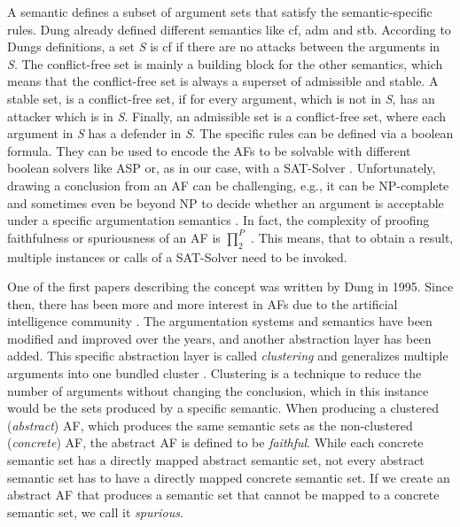A semantic defines a subset of argument sets that satisfy the semantic-specific rules. Dung already defined different semantics \cite{Dung1995-DUNOTA-2} like \ac{cf}, \ac{adm} and \ac{stb}. According to Dungs definitions, a set \textit{S} is \ac{cf} if there are no attacks between the arguments in \textit{S}. The conflict-free set is mainly a building block for the other semantics, which means that the conflict-free set is always a superset of admissible and stable. 
A stable set, is a conflict-free set, if for every argument, which is not in \textit{S}, has an attacker which is in \textit{S}. 
Finally, an admissible set is a conflict-free set, where each argument in \textit{S} has a defender in \textit{S}. 
The specific rules can be defined via a boolean formula. They can be used to encode the \acp{AF} to be solvable with different boolean solvers like \ac{ASP} \cite{DBLP:journals/corr/abs-1301-1388} or, as in our case, with a \ac{SAT-Solver} \cite{DBLP:journals/amai/AmgoudD13}. Unfortunately, drawing a conclusion from an AF can be challenging, e.g., it can be NP-complete and sometimes even be beyond NP to decide whether an argument is acceptable under a specific argumentation semantics \cite{DBLP:journals/ai/DvorakGRW23}. In fact, the complexity of proofing faithfulness or spuriousness of an \ac{AF} is $\prod_2^P$ \cite{DBLP:conf/kr/SaribaturW21}. This means, that to obtain a result, multiple instances or calls of a SAT-Solver need to be invoked. 


One of the first papers describing the concept was written by Dung \cite{Dung1995-DUNOTA-2} in 1995. Since then, there has been more and more interest in \acp{AF} due to the artificial intelligence community \cite{DBLP:books/ox/22/CocarascuC0T22}. The argumentation systems and semantics have been modified and improved over the years, and another abstraction layer has been added. This specific abstraction layer is called \emph{clustering} and generalizes multiple arguments into one bundled cluster \cite{DBLP:conf/kr/SaribaturW21}. Clustering is a technique to reduce the number of arguments without changing the conclusion, which in this instance would be the sets produced by a specific semantic. When producing a clustered (\emph{abstract}) \ac{AF}, which produces the same semantic sets as the non-clustered (\emph{concrete}) \ac{AF}, the abstract \ac{AF} is defined to be \emph{faithful}. While each concrete semantic set has a directly mapped abstract semantic set, not every abstract semantic set has to have a directly mapped concrete semantic set. If we create an abstract \ac{AF} that produces a semantic set that cannot be mapped to a concrete semantic set, we call it \emph{spurious}.



